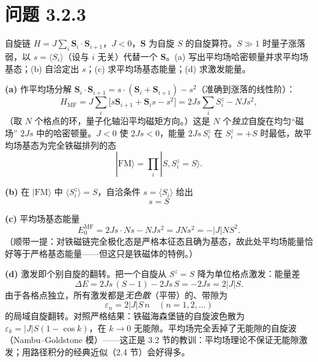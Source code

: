 \section*{问题 3.2.3}
\begin{problem}
自旋链 $H=J\sum_i\pmb{S}_i\cdot\pmb{S}_{i+1}$，$J<0$，$\pmb{S}$ 为自旋 $S$ 的自旋算符。$S\gg1$ 时量子涨落弱，以 $s=\langle S_i\rangle$（设与 $i$ 无关）代替一个 $\pmb{S}$。(a) 写出平均场哈密顿量并求平均场基态；(b) 自洽定出 $s$；(c) 求平均场基态能量；(d) 求激发能量。
\end{problem}
\solution

\textbf{(a)} 作平均场分解 $\pmb{S}_i\cdot\pmb{S}_{i+1}
=s\cdot(\pmb{S}_i+\pmb{S}_{i+1})-s^{2}$（准确到涨落的线性阶）：
\begin{equation*}
H_{\mathrm{MF}}=J\sum_i\big[s\pmb{S}_{i+1}+\pmb{S}_i s-s^{2}\big]
=2Js\sum_i S_i^{z}-NJs^{2} ,
\end{equation*}
（取 $N$ 个格点的环，量子化轴沿平均磁矩方向。）这是 $N$ 个\emph{独立}自旋在均匀“磁场” $2Js$ 中的哈密顿量。$J<0$ 使 $2Js<0$，能量 $2Js\,S_i^{z}$ 在 $S_i^{z}=+S$ 时最低，故平均场基态为完全铁磁排列的态
\begin{equation*}
|\mathrm{FM}\rangle=\prod_{i}|S,S_i^{z}{=}S\rangle .
\end{equation*}

\textbf{(b)} 在 $|\mathrm{FM}\rangle$ 中 $\langle S_i^{z}\rangle=S$，自洽条件 $s=\langle S_i\rangle$ 给出
\begin{equation*}
\boxed{\;s=S\;}
\end{equation*}

\textbf{(c)} 平均场基态能量
\begin{equation*}
E_0^{\mathrm{MF}}=2Js\cdot Ns-NJs^{2}=JNs^{2}=-|J|NS^{2} .
\end{equation*}
（顺带一提：对铁磁链完全极化态是严格本征态且确为基态，故此处平均场能量恰好等于严格基态能量——但这只是铁磁体的特例。）

\textbf{(d)} 激发即个别自旋的翻转。把一个自旋从 $S^{z}=S$ 降为单位格点激发：能量差
\begin{equation*}
\Delta E=2Js\,(S-1)-2Js\,S=-2Js=2|J|S .
\end{equation*}
由于各格点独立，所有激发都是\emph{无色散}（平带）的、带隙为
\begin{equation*}
\boxed{\;\varepsilon_n=2|J|S\,n\quad(n=1,2,\dots)\;}
\end{equation*}
的局域自旋翻转。对照严格结果：铁磁海森堡链的自旋波色散为 $\varepsilon_k=|J|S(1-\cos k)$，在 $k\to0$ 无能隙。平均场完全丢掉了无能隙的自旋波（Nambu--Goldstone 模）——这正是 3.2 节的教训：平均场理论不保证无能隙激发；用路径积分的经典近似（2.4 节）会好得多。

